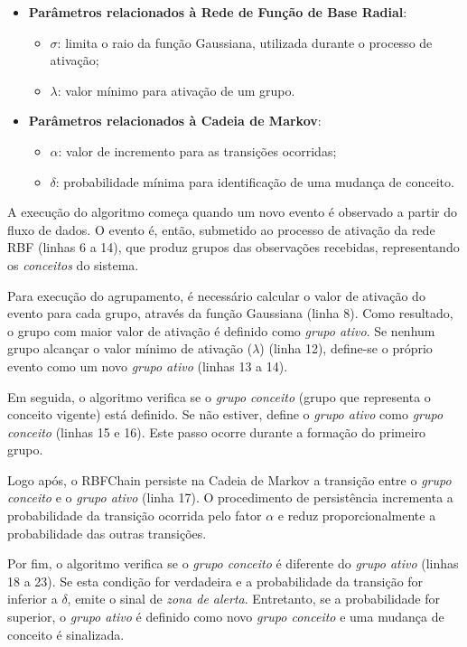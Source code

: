 \documentclass[msc, classic, a4paper]{ufbathesis}
\begin{document}
\begin{itemize}
    \item \textbf{Parâmetros relacionados à Rede de Função de Base Radial}:
    \begin{itemize}
        \item \textbf{$\sigma$}: limita o raio da função Gaussiana,  utilizada durante o processo de ativação;
        \item \textbf{$\lambda$}: valor mínimo para ativação de um grupo.
    \end{itemize}

    \item \textbf{Parâmetros relacionados à Cadeia de Markov}:
    \begin{itemize}
        \item \textbf{$\alpha$}: valor de incremento para as transições ocorridas;
        \item \textbf{$\delta$}: probabilidade mínima para identificação de uma mudança de conceito.
    \end{itemize}
\end{itemize}

A execução do algoritmo começa quando um novo evento é observado a partir do fluxo de dados. O evento é, então, submetido ao processo de ativação da rede RBF (linhas 6 a 14), que produz grupos das observações recebidas, representando os \textit{conceitos} do sistema. 

Para execução do agrupamento, é necessário calcular o valor de ativação do evento para cada grupo, através da função Gaussiana (linha 8). 
Como resultado, o grupo com maior valor de ativação é definido como \textit{grupo ativo}. Se nenhum grupo alcançar o valor mínimo de ativação ($\lambda$) (linha 12), define-se o próprio evento como um novo \textit{grupo ativo} (linhas 13 a 14). 

Em seguida, o algoritmo verifica se o \textit{grupo conceito} (grupo que representa o conceito vigente) está definido. Se não estiver, define o \textit{grupo ativo} como \textit{grupo conceito} (linhas 15 e 16). Este passo ocorre durante a formação do primeiro grupo.

Logo após, o RBFChain persiste na Cadeia de Markov a transição entre o \textit{grupo conceito} e o \textit{grupo ativo} (linha 17). 
O procedimento de persistência incrementa a probabilidade da transição ocorrida pelo fator $\alpha$ e reduz proporcionalmente a probabilidade das outras transições.

Por fim, o algoritmo verifica se o \textit{grupo conceito} é diferente do \textit{grupo ativo} (linhas 18 a 23).
Se esta condição for verdadeira e a probabilidade da transição for inferior a $\delta$, emite o sinal de \textit{zona de alerta}. 
Entretanto, se a probabilidade for superior, o \textit{grupo ativo} é definido como novo \textit{grupo conceito} e uma mudança de conceito é sinalizada.
\end{document}
